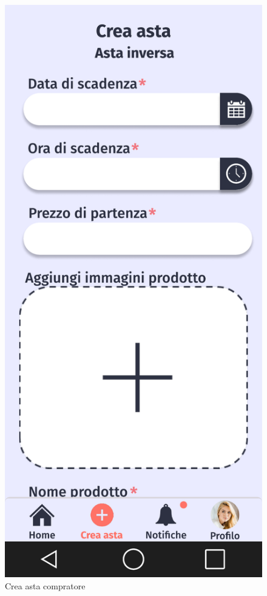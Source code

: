 \begin{figure}[!htb]
\begin{minipage}{0.32\textwidth}
                \includegraphics[width=.7\linewidth]{Immagini/Frames/Compratore/C4.pdf}
                \caption{Crea asta compratore}
            \end{minipage}\hfill
        \end{figure}
    
